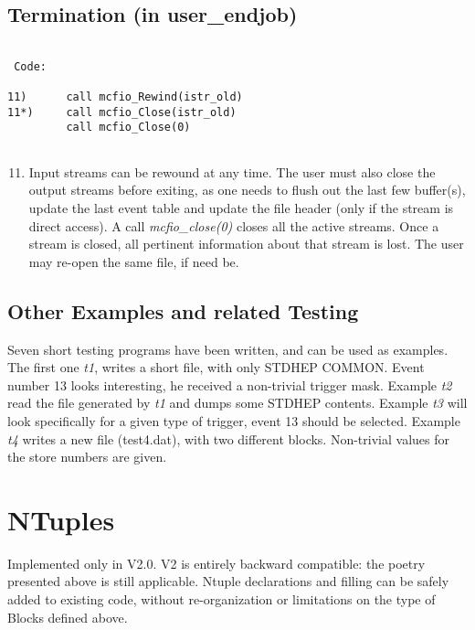 \subsection{Termination (in user\_endjob)}
\vspace{.1in}
\begin{verbatim}

 Code:

11)      call mcfio_Rewind(istr_old)
11*)     call mcfio_Close(istr_old)
         call mcfio_Close(0)
	 
\end{verbatim}
\vspace{.1in}
\begin{enumerate}
\setcounter{enumi}{10}
\item Input streams  can be rewound at any time.  The user must also
 close the output streams before exiting, as 
one needs to flush out the last few buffer(s), update the last event 
table and update the file header (only if the stream is direct access).
A call {\em mcfio\_close(0)}  closes all the active streams. Once 
a stream is closed, all pertinent information about that stream is lost.
The user may  re-open the same file, if need be. 
\end{enumerate}


\subsection{Other Examples and  related Testing}

Seven short testing programs have been written, and can be used as  examples.
The first one {\em t1}, writes a short file, with only STDHEP COMMON. Event
number 13 looks interesting, he received a non-trivial  trigger mask. Example
{\em t2} read the file generated by {\em t1} and dumps  some STDHEP contents.
Example {\em t3} will look specifically for a  given type of trigger, event 13
should be selected. Example {\em t4}  writes a new file (test4.dat), with two
different blocks. Non-trivial values for the  store numbers are given.

\section{NTuples}

	Implemented only in V2.0.  V2 is entirely backward compatible: 
the poetry presented above is still applicable.  Ntuple declarations and filling
can be safely added to existing code, without re-organization or limitations 
on the type of Blocks defined above. 

